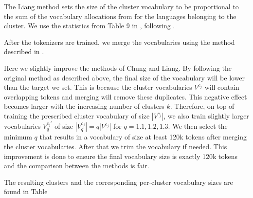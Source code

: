 The Liang method sets the size of the cluster vocabulary to be proportional to the sum of the vocabulary allocations from \citet{zheng_allocating_2021} for the languages belonging to the cluster. We use the statistics from Table 9 in \citet{zheng_allocating_2021}, following \citet{liang_xlm-v_2023}.

After the tokenizers are trained, we merge the vocabularies using the method described in . 

Here we slightly improve the methods of Chung and Liang. By following the original method as described above, the final size of the vocabulary will be lower than the target we set. This is because the cluster vocabularies $V^{c_j}$ will contain overlapping tokens and merging will remove these duplicates. This negative effect becomes larger with the increasing number of clusters $k$. Therefore, on top of training the prescribed cluster vocabulary of size $|V^{c_j}|$, we also train slightly larger vocabularies $V_q^{c_j'}$ of size $|V_q^{c_j}| = q|V^{c_j}|$ for $q = 1.1, 1.2, 1.3$. We then select the minimum $q$ that results in a vocabulary of size at least 120k tokens after merging the cluster vocabularies. After that we trim the vocabulary if needed. This improvement is done to ensure the final vocabulary size is exactly 120k tokens and the comparison between the methods is fair.

The resulting clusters and the corresponding per-cluster vocabulary sizes are found in Table 


